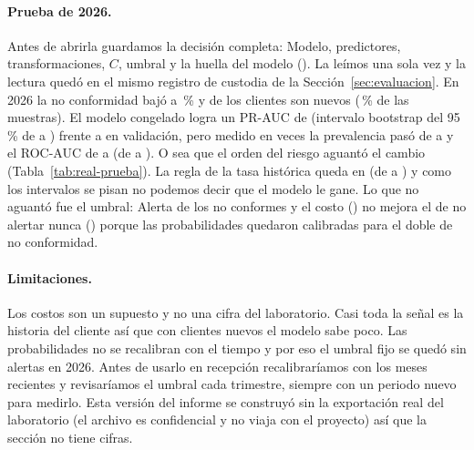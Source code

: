 \paragraph{Prueba de 2026.} Antes de abrirla guardamos la decisión
completa: Modelo, predictores, transformaciones, $C$, umbral
\RealUmbral{} y la huella del modelo (\RealCongeladoHuella{}). La leímos
una sola vez y la lectura quedó en el mismo registro de custodia de la
Sección~\ref{sec:evaluacion}. En 2026 la no conformidad bajó a
\RealPruebaPrevalenciaPct{}\,\% y \RealPruebaClientesNuevos{} de los
\RealPruebaClientes{} clientes son nuevos (\RealPruebaNuevasPct{}\,\% de las
muestras). El modelo congelado logra un PR-AUC de \RealPruebaAP{} (intervalo
bootstrap del 95\,\% de \RealPruebaAPInf{} a \RealPruebaAPSup{}) frente a
\RealRiesgoAPElegido{} en validación, pero medido en veces la prevalencia
pasó de \RealValidacionVeces{} a \RealPruebaVeces{} y el ROC-AUC de
\RealRiesgoAUCElegido{} a \RealPruebaAUC{} (de \RealPruebaAUCInf{} a
\RealPruebaAUCSup{}). O sea que el orden del riesgo aguantó el cambio
(Tabla~\ref{tab:real-prueba}). La regla de la tasa histórica queda en
\RealPruebaAPRegla{} (de \RealPruebaAPReglaInf{} a \RealPruebaAPReglaSup{})
y como los intervalos se pisan no podemos decir que el modelo le gane. Lo
que no aguantó fue el umbral: Alerta \RealPruebaTP{} de los
\RealPruebaPositivos{} no conformes y el costo (\RealPruebaCosto{}) no mejora
el de no alertar nunca (\RealPruebaCostoNada{}) porque las probabilidades
quedaron calibradas para el doble de no conformidad.

\begin{table}[!htbp]
\centering
{}
\caption{Prueba de 2026 evaluada una sola vez con lo congelado, con
intervalos bootstrap del 95\,\%: El modelo ordena mejor que el azar pero no
se separa de la regla y su umbral ya no sirve.}
\label{tab:real-prueba}
\end{table}

\paragraph{Limitaciones.} Los costos son un supuesto y no una cifra del
laboratorio. Casi toda la señal es la historia del cliente así que con
clientes nuevos el modelo sabe poco. Las probabilidades no se recalibran con
el tiempo y por eso el umbral fijo se quedó sin alertas en 2026. Antes de
usarlo en recepción recalibraríamos con los meses recientes y revisaríamos
el umbral cada trimestre, siempre con un periodo nuevo para medirlo.
\else
Esta versión del informe se construyó sin la exportación real del
laboratorio (el archivo es confidencial y no viaja con el proyecto) así que
la sección no tiene cifras.
\fi
